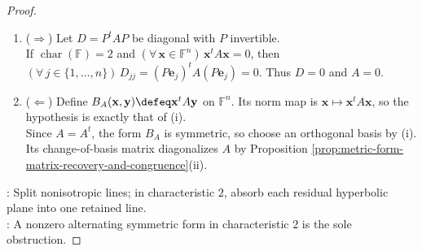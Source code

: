 \begin{theorem}
\begin{proof}
\begin{enumerate}[label=(\roman*)]
Assume $\operatorname{char}(\mathbb{F})=2$; then $B|_{\mathcal{W}}$ alternating. By Theorem \ref{thm:symplectic-geometries-hyperbolic-classification}(ii), $\mathcal{W}=R\odot\mathcal{H}_1\odot\cdots\odot\mathcal{H}_t$, $B|_R=0$, each $\mathcal{H}_j$ hyperbolic.\\
Fix a current $\mathbf{u}$ with $q(\mathbf{u})=a\neq0$. For a hyperbolic basis $(\mathbf{e},\mathbf{f})$ of $\mathcal{H}_j$, rescale $\mathbf{f}$ so that $B(\mathbf{e},\mathbf{f})=a$.\\
The vectors $\mathbf{u}+\mathbf{e}$, $\mathbf{u}+\mathbf{f}$, and $\mathbf{u}+\mathbf{e}+\mathbf{f}$ are independent by coefficient comparison.\\
These vectors have norm $a$ and mutual pairings $a+a=0$, so they form an orthogonal basis of $\mathbb{F}\mathbf{u}\odot\mathcal{H}_j$.\\
Retain one new line for the next plane; after $t$ replacements, append a basis of $R$.\\
The resulting diagonal matrix has exactly $r$ nonzero entries by rank invariance.
\item[$(ii)$] ($\Rightarrow$) Let $D=P^tAP$ be diagonal with $P$ invertible.\\
If $\operatorname{char}(\mathbb{F})=2$ and $(\forall\,\mathbf{x}\in\mathbb{F}^n)\,\mathbf{x}^tA\mathbf{x}=0$, then $(\forall\,j\in\{1,\ldots,n\})\,D_{jj}=(P\mathbf{e}_j)^tA(P\mathbf{e}_j)=0$. Thus $D=0$ and $A=0$.
\item[$(ii)$] ($\Leftarrow$) Define $B_A(\mathbf{x},\mathbf{y})\defeq\mathbf{x}^tA\mathbf{y}$ on $\mathbb{F}^n$. Its norm map is $\mathbf{x}\mapsto\mathbf{x}^tA\mathbf{x}$, so the hypothesis is exactly that of (i).\\
Since $A=A^t$, the form $B_A$ is symmetric, so choose an orthogonal basis by (i).\\
Its change-of-basis matrix diagonalizes $A$ by Proposition \ref{prop:metric-form-matrix-recovery-and-congruence}(ii).
\end{enumerate}
: Split nonisotropic lines; in characteristic $2$, absorb each residual hyperbolic plane into one retained line.\\
: A nonzero alternating symmetric form in characteristic $2$ is the sole obstruction.
\end{proof}
\end{theorem}

